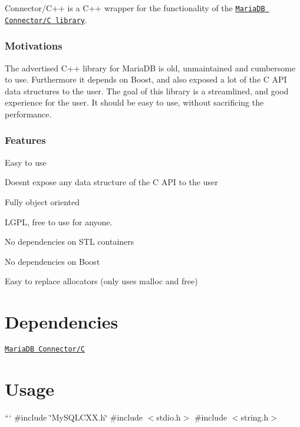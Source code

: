 Connector/\+C++ is a C++ wrapper for the functionality of the \href{https://github.com/MariaDB/mariadb-connector-c}{\tt Maria\+D\+B Connector/\+C library}.

\subsubsection*{Motivations}

The advertised C++ library for Maria\+D\+B is old, unmaintained and cumbersome to use. Furthermore it depends on Boost, and also exposed a lot of the C A\+P\+I data structures to the user. The goal of this library is a streamlined, and good experience for the user. It should be easy to use, without sacrificing the performance.

\subsubsection*{Features}


\begin{DoxyItemize}
\item Easy to use
\item Doesn\textquotesingle{}t expose any data structure of the C A\+P\+I to the user
\item Fully object oriented
\item L\+G\+P\+L, free to use for anyone.
\item No dependencies on S\+T\+L containers
\item No dependencies on Boost
\item Easy to replace allocators (only uses {\ttfamily malloc} and {\ttfamily free})
\end{DoxyItemize}

\section*{Dependencies}


\begin{DoxyItemize}
\item \href{https://github.com/MariaDB/mariadb-connector-c}{\tt Maria\+D\+B Connector/\+C}
\end{DoxyItemize}

\section*{Usage}

``` \#include \char`\"{}\+My\+S\+Q\+L\+C\+X\+X.\+h\char`\"{} \#include $<$stdio.\+h$>$ \#include $<$string.\+h$>$

